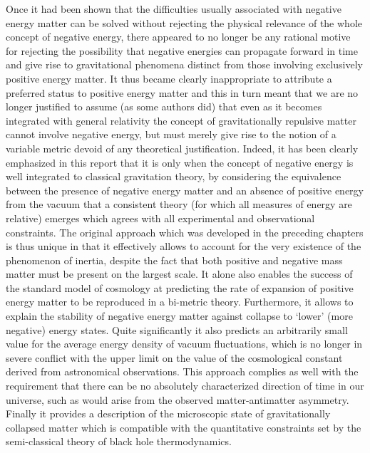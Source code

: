 \documentclass[notitlepage,12pt]{report}
\begin{document}
Once it had been shown that the difficulties usually associated with negative energy matter can be solved without rejecting the physical relevance of the whole concept of negative energy, there appeared to no longer be any rational motive for rejecting the possibility that negative energies can propagate forward in time and give rise to gravitational phenomena distinct from those involving exclusively positive energy matter. It thus became clearly inappropriate to attribute a preferred status to positive energy matter and this in turn meant that we are no longer justified to assume (as some authors did) that even as it becomes integrated with general relativity the concept of gravitationally repulsive matter cannot involve negative energy, but must merely give rise to the notion of a variable metric devoid of any theoretical justification. Indeed, it has been clearly emphasized in this report that it is only when the concept of negative energy is well integrated to classical gravitation theory, by considering the equivalence between the presence of negative energy matter and an absence of positive energy from the vacuum that a consistent theory (for which all measures of energy are relative) emerges which agrees with all experimental and observational constraints. The original approach which was developed in the preceding chapters is thus unique in that it effectively allows to account for the very existence of the phenomenon of inertia, despite the fact that both positive and negative mass matter must be present on the largest scale. It alone also enables the success of the standard model of cosmology at predicting the rate of expansion of positive energy matter to be reproduced in a bi-metric theory. Furthermore, it allows to explain the stability of negative energy matter against collapse to `lower' (more negative) energy states. Quite significantly it also predicts an arbitrarily small value for the average energy density of vacuum fluctuations, which is no longer in severe conflict with the upper limit on the value of the cosmological constant derived from astronomical observations. This approach complies as well with the requirement that there can be no absolutely characterized direction of time in our universe, such as would arise from the observed matter-antimatter asymmetry. Finally it provides a description of the microscopic state of gravitationally collapsed matter which is compatible with the quantitative constraints set by the semi-classical theory of black hole thermodynamics.
\end{document}
